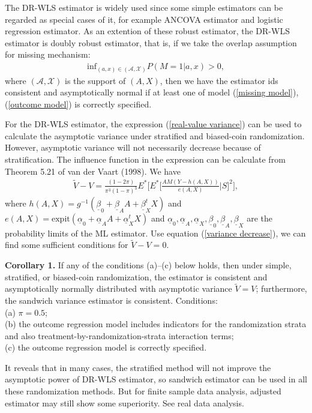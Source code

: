 \documentclass{article}
\begin{document}
The DR-WLS estimator is widely used since some simple estimators can be regarded as special cases of it, for example ANCOVA estimator and logistic regression estimator. As an extention of these robust estimator, the DR-WLS estimator is doubly robust estimator, that is, if we take the overlap assumption for missing mechanism:
\begin{align}
    \mathrm{inf}_{(a,x)\in(\mathcal{A},\mathcal{X})}P(M=1|a,x)>0,\nonumber
\end{align}
where $(\mathcal{A},\mathcal{X})$ is the support of $(A,X)$, then we have the estimator ids consistent and asymptotically normal if at least one of model (\ref{missing model}),(\ref{outcome model}) is correctly specified.

For the DR-WLS estimator, the expression (\ref{real-value variance}) can be used to calculate the asymptotic variance under stratified and biased-coin randomization. However, asymptotic variance will not necessarily decrease because of stratification.
The influence function in the expression can be calculate from Theorem 5.21 of van der Vaart (1998). We have
\begin{align}\label{variance decrease}
    \widetilde{V}-V=\frac{(1-2\pi)}{\pi^{3}(1-\pi)^{3}}E^*\bigg[E^*\Big[\frac{AM(Y-h(A,X))}{e(A,X)}\Big|S\Big]^{2}\bigg],
\end{align}
where $h(A,X)=g^{-1}(\underline{\beta}_0+\underline{\beta}_A A+\underline{\beta}_{X}^{t}X)$ and $e(A,X)=\mathrm{expit}(\underline{\alpha}_0+\underline{\alpha}_A A+\underline{\alpha}_{X}^{t}X)$ and $\underline{\alpha}_0,\underline{\alpha}_A,\underline{\alpha}_X,\underline{\beta}_0,\underline{\beta}_A,\underline{\beta}_X$ are the probability limits of the ML estimator. Use equation (\ref{variance decrease}), we can find some sufficient conditions for $\widetilde{V}-V=0$. 

\textbf{Corollary 1.} If any of the conditions (a)–(c) below holds, then under simple, stratified, or biased-coin randomization, the estimator is consistent and asymptotically normally distributed with asymptotic variance $\widetilde{V}=V$; furthermore, the sandwich variance estimator is consistent. Conditions:\\
(a) $\pi=0.5$;\\
(b) the outcome regression model includes indicators for the randomization strata and also treatment-by-randomization-strata interaction terms;\\
(c) the outcome regression model is correctly specified.

It reveals that in many cases, the stratified method will not improve the asymptotic power of DR-WLS estimator, so sandwich estimator can be used in all these randomization methods. But for finite sample data analysis, adjusted estimator may still show some superiority. See real data analysis.
\end{document}

